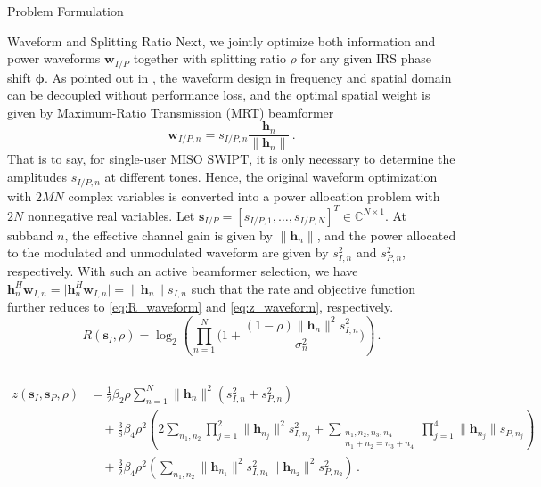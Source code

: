 \documentclass[journal]{IEEEtran}
\begin{document}
\begin{section}{Problem Formulation}
		\begin{subsection}{Waveform and Splitting Ratio}
			Next, we jointly optimize both information and power waveforms $\boldsymbol{w}_{I/P}$ together with splitting ratio $\rho$ for any given IRS phase shift $\boldsymbol{\phi}$. As pointed out in \cite{Clerckx2018b}, the waveform design in frequency and spatial domain can be decoupled without performance loss, and the optimal spatial weight is given by Maximum-Ratio Transmission (MRT) beamformer
			\begin{equation}\label{eq:w_IP}
				\boldsymbol{w}_{I/P,n}=s_{I/P,n}\frac{\boldsymbol{h}_n}{\lVert{\boldsymbol{h}_n}\rVert}\,.
			\end{equation}
			That is to say, for single-user MISO SWIPT, it is only necessary to determine the amplitudes $s_{I/P,n}$ at different tones. Hence, the original waveform optimization with $2MN$ complex variables is converted into a power allocation problem with $2N$ nonnegative real variables. Let $\boldsymbol{s}_{I/P}=[s_{I/P,1},\dots,s_{I/P,N}]^T \in \mathbb{C}^{N \times 1}$. At subband $n$, the effective channel gain is given by $\lVert{\boldsymbol{h}_n}\rVert$, and the power allocated to the modulated and unmodulated waveform are given by $s_{I,n}^2$ and $s_{P,n}^2$, respectively. With such an active beamformer selection, we have $\boldsymbol{h}_n^H\boldsymbol{w}_{I,n}=\lvert{\boldsymbol{h}_n^H\boldsymbol{w}_{I,n}}\rvert=\lVert{\boldsymbol{h}_n}\rVert s_{I,n}$ such that the rate and objective function further reduces to \ref{eq:R_waveform} and \ref{eq:z_waveform}, respectively.
			\begin{equation}\label{eq:R_waveform}
				R(\boldsymbol{s}_I,\rho) = \log_2\left(\prod_{n=1}^N\biggl(1+\frac{(1-\rho)\lVert{\boldsymbol{h}_n}\rVert^2 s_{I,n}^2}{\sigma_n^2}\biggr)\right)\,.
			\end{equation}
			\begin{figure*}[b]
				\hrule
				\begin{align}
					z(\boldsymbol{s}_I,\boldsymbol{s}_P,\rho)
					& = \frac{1}{2}{\beta_2}{\rho} \sum_{n=1}^N \lVert{\boldsymbol{h}_n}\rVert^2(s_{I,n}^2+s_{P,n}^2)\nonumber\\
					& \quad + \frac{3}{8}{\beta_4}{\rho^2} \left( 2\sum_{n_1,n_2} \prod_{j=1}^2 \lVert{\boldsymbol{h}_{n_j}}\rVert^2 s_{I,{n_j}}^2 + \sum_{\substack{{n_1},{n_2},{n_3},{n_4}\\{n_1}+{n_2}={n_3}+{n_4}}} \prod_{j=1}^4 \lVert{\boldsymbol{h}_{n_j}}\rVert s_{P,{n_j}} \right)\nonumber\\
					& \quad + \frac{3}{2}{\beta_4}{\rho^2} \left( \sum_{n_1,n_2} \lVert{\boldsymbol{h}_{n_1}}\rVert^2 s_{I,{n_1}}^2 \lVert{\boldsymbol{h}_{n_2}}\rVert^2 s_{P,{n_2}}^2 \right)\,.\label{eq:z_waveform}

\end{align}
\end{figure*}
\end{subsection}
\end{section}
\end{document}
